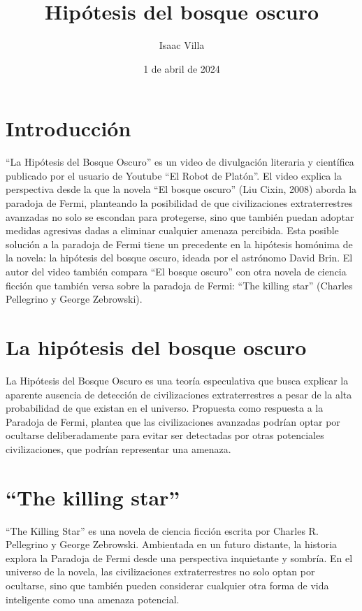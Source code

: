 \documentclass{article}
\title{Hipótesis del bosque oscuro}
\author{Isaac Villa}
\date{1 de abril de 2024}
\begin{document}
\maketitle

\section{Introducción}

``La Hipótesis del Bosque Oscuro'' es un video de divulgación literaria y científica publicado por el usuario de Youtube ``El Robot de Platón''. El video explica la perspectiva desde la que la novela ``El bosque oscuro'' (Liu Cixin, 2008) aborda la paradoja de Fermi, planteando la posibilidad de que civilizaciones extraterrestres avanzadas no solo se escondan para protegerse, sino que también puedan adoptar medidas agresivas dadas a eliminar cualquier amenaza percibida. Esta posible solución a la paradoja de Fermi tiene un precedente en la hipótesis homónima de la novela: la hipótesis del bosque oscuro, ideada por el astrónomo David Brin. El autor del video también compara ``El bosque oscuro'' con otra novela de ciencia ficción que también versa sobre la paradoja de Fermi: ``The killing star'' (Charles Pellegrino y George Zebrowski).

\maketitle

\section{La hipótesis del bosque oscuro}

La Hipótesis del Bosque Oscuro es una teoría especulativa que busca explicar la aparente ausencia de detección de civilizaciones extraterrestres a pesar de la alta probabilidad de que existan en el universo. Propuesta como respuesta a la Paradoja de Fermi, plantea que las civilizaciones avanzadas podrían optar por ocultarse deliberadamente para evitar ser detectadas por otras potenciales civilizaciones, que podrían representar una amenaza.

\maketitle

\section{``The killing star''}
``The Killing Star'' es una novela de ciencia ficción escrita por Charles R. Pellegrino y George Zebrowski. Ambientada en un futuro distante, la historia explora la Paradoja de Fermi desde una perspectiva inquietante y sombría. En el universo de la novela, las civilizaciones extraterrestres no solo optan por ocultarse, sino que también pueden considerar cualquier otra forma de vida inteligente como una amenaza potencial.
\end{document}

